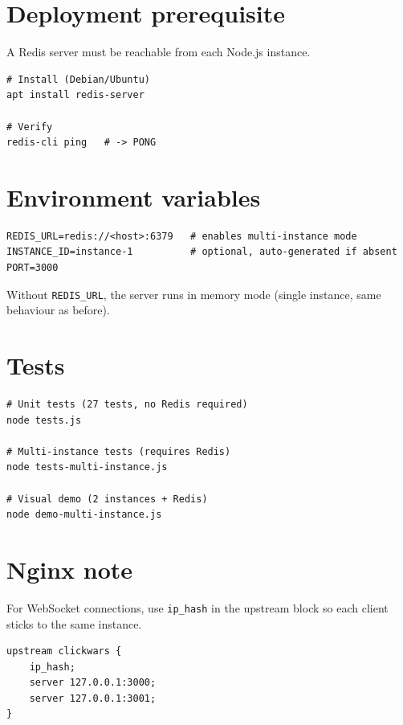 \documentclass[12pt, a4paper]{article}
\begin{document}
\section*{Deployment prerequisite}

A Redis server must be reachable from each Node.js instance.

\begin{lstlisting}
# Install (Debian/Ubuntu)
apt install redis-server

# Verify
redis-cli ping   # -> PONG
\end{lstlisting}

\section*{Environment variables}

\begin{lstlisting}
REDIS_URL=redis://<host>:6379   # enables multi-instance mode
INSTANCE_ID=instance-1          # optional, auto-generated if absent
PORT=3000
\end{lstlisting}

Without \texttt{REDIS\_URL}, the server runs in memory mode (single instance, same behaviour as before).

\section*{Tests}

\begin{lstlisting}
# Unit tests (27 tests, no Redis required)
node tests.js

# Multi-instance tests (requires Redis)
node tests-multi-instance.js

# Visual demo (2 instances + Redis)
node demo-multi-instance.js
\end{lstlisting}

\section*{Nginx note}

For WebSocket connections, use \texttt{ip\_hash} in the upstream block so each client sticks to the same instance.

\begin{lstlisting}
upstream clickwars {
    ip_hash;
    server 127.0.0.1:3000;
    server 127.0.0.1:3001;
}
\end{lstlisting}
\end{document}
